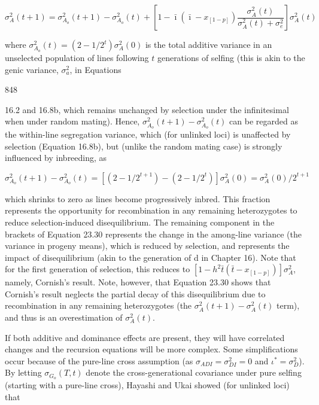 \documentclass{article}
\begin{document}
\begin{equation}
\sigma_{A}^{2}(t+1)=\sigma_{A_{o}}^{2}(t+1)-\sigma_{A_{o}}^{2}(t)+\left[1-\bar{\imath}(\bar{\imath}-x_{[1-p]})\frac{\sigma_{A}^{2}(t)}{\sigma_{A}^{2}(t)+\sigma_{e}^{2}}\right]\sigma_{A}^{2}(t)
\tag{23.30}
\label{eq:23_30}
\end{equation}

where  $ \sigma_{A_o}^2(t) = (2 - 1/2^t) \sigma_A^2(0) $ is the total additive variance in an unselected population of lines following  $ t $ generations of selfing (this is akin to the genic variance,  $ \sigma_a^2 $, in Equations

848

16.2 and 16.8b, which remains unchanged by selection under the infinitesimal when under random mating). Hence,  $ \sigma_{A_o}^2(t+1) - \sigma_{A_o}^2(t) $ can be regarded as the within-line segregation variance, which (for unlinked loci) is unaffected by selection (Equation 16.8b), but (unlike the random mating case) is strongly influenced by inbreeding, as

\begin{equation}
\sigma_{A_{o}}^{2}(t+1)-\sigma_{A_{o}}^{2}(t)=\left[\left(2-1/2^{t+1}\right)-\left(2-1/2^{t}\right)\right]\sigma_{A}^{2}(0)=\sigma_{A}^{2}(0)/2^{t+1}
\end{equation}

which shrinks to zero as lines become progressively inbred. This fraction represents the opportunity for recombination in any remaining heterozygotes to reduce selection-induced disequilibrium. The remaining component in the brackets of Equation 23.30 represents the change in the among-line variance (the variance in progeny means), which is reduced by selection, and represents the impact of disequilibrium (akin to the generation of d in Chapter 16). Note that for the first generation of selection, this reduces to  $ [1 - h^2\bar{t}(\bar{t} - x_{[1-p]})]\sigma_A^2 $, namely, Cornish's result. Note, however, that Equation 23.30 shows that Cornish's result neglects the partial decay of this disequilibrium due to recombination in any remaining heterozygotes (the  $ \sigma_A^2(t + 1) - \sigma_A^2(t) $ term), and thus is an overestimation of  $ \sigma_A^2(t) $.

If both additive and dominance effects are present, they will have correlated changes and the recursion equations will be more complex. Some simplifications occur because of the pure-line cross assumption (as  $ \sigma_{ADI} = \sigma_{DI}^2 = 0 $ and  $ \iota^* = \sigma_D^2 $). By letting  $ \sigma_{G_o}(T, t) $ denote the cross-generational covariance under pure selfing (starting with a pure-line cross), Hayashi and Ukai showed (for unlinked loci) that
\end{document}
